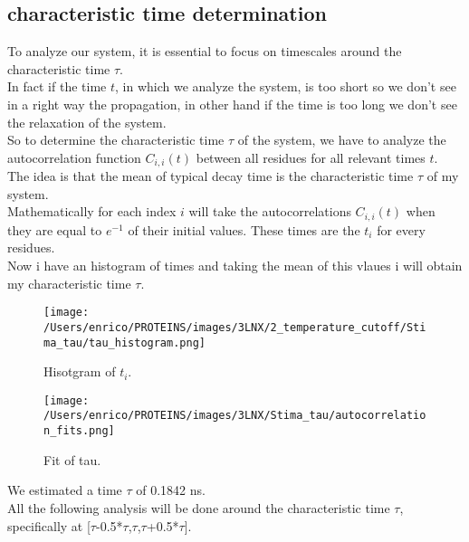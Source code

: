 \documentclass[English, Lau, oneside]{sapthesis}
\begin{document}
\subsection{characteristic time determination}
\noindent To analyze our system, it is essential to focus on timescales around the characteristic time \(\tau\). \\
In fact if the time \(t\), in which we analyze the system, is too short so we don't see in a right way the propagation, in other hand if the time is too long we don't see the relaxation of the system.\\
So to determine the characteristic time \(\tau\) of the system, we have to analyze the autocorrelation function \(C_{i,i}(t)\) between all residues for all relevant times \(t\). \\
The idea is that the mean of typical decay time is the characteristic time \(\tau\) of my system.\\
Mathematically for each index \(i\)  will take the autocorrelations \(C_{i,i}(t)\) when they are equal to \(e^{-1}\) of their initial values. These times are the \(t_i\) for every residues.\\
Now i have an histogram of times and taking the mean of this vlaues i will obtain my characteristic time \(\tau\).\\
\begin{figure}[h!]
    \centering
    \texttt{[image: /Users/enrico/PROTEINS/images/3LNX/2\_temperature\_cutoff/Stima\_tau/tau\_histogram.png]}
    \caption{Hisotgram of \(t_i\).}
\end{figure} 

\begin{figure}[h!]
    \centering
    \texttt{[image: /Users/enrico/PROTEINS/images/3LNX/Stima\_tau/autocorrelation\_fits.png]}
    \caption{Fit of tau.}
\end{figure}
We estimated a time \(\tau\) of 0.1842 ns.\\



All the following analysis will be done around the characteristic time \(\tau\), specifically at [\(\tau\)-0.5*\(\tau\),\(\tau\),\(\tau\)+0.5*\(\tau\)].
\newpage
\end{document}
